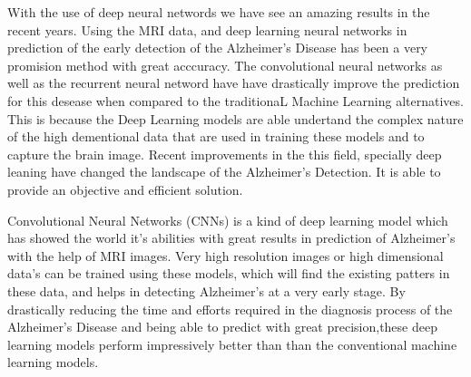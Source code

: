 \documentclass[12pt,onecolumn]{report}
\begin{document}
With the use of deep neural networds we have see an amazing results in the recent years. Using the MRI data, and deep learning neural networks in prediction of the early detection of the Alzheimer’s Disease has been a very promision method with great acccuracy. The convolutional neural networks as well as the recurrent neural netword have have drastically improve the prediction for this desease when compared to the traditionaL Machine Learning alternatives. This is because the Deep Learning models are able undertand the complex nature of the high dementional data that are used in training these models and to capture the brain image\cite{2019Jo}. Recent improvements in the this field, specially deep leaning have changed the landscape of the Alzheimer’s Detection. It is able to provide an objective and efficient solution.

Convolutional Neural Networks (CNNs) is a kind of deep learning model which has showed the world it's abilities with great results in prediction of Alzheimer’s with the help of MRI images. Very high resolution images or high dimensional data's can be trained using these models, which will find the existing patters in these data, and helps in detecting Alzheimer’s at a very early stage. By drastically reducing the time and efforts required in the diagnosis process of the Alzheimer’s Disease and being able to predict with great precision,these deep learning models perform impressively better than than the conventional machine learning models.
\end{document}
